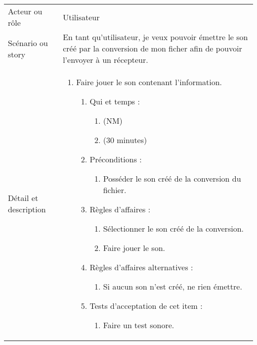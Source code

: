 \begin{longtable}{|l|p{}|}
\hline
    \rowcolor{Gray}
    \multicolumn{2}{|l|}{5} \\
\hline
    Acteur ou rôle & Utilisateur \\
\hline
    Scénario ou story & En tant qu'utilisateur, 
      je veux pouvoir émettre le son créé par la conversion de mon ficher afin de pouvoir l'envoyer à un récepteur. \\
\hline
    Détail et description &
        \begin{enumerate}[label*=\arabic*.]
            \item Faire jouer le son contenant l'information.
            \begin{enumerate}[label*=\arabic*.]
                    \item Qui et temps :
                    \begin{enumerate}[label*=\arabic*.]
                        \item (NM)
                        \item (30 minutes)
                    \end{enumerate}
                    \item Préconditions : 
                    \begin{enumerate}[label*=\arabic*.]
                        \item Posséder le son créé de la conversion du fichier.
                    \end{enumerate}
                    \item Règles d’affaires :
                    \begin{enumerate}[label*=\arabic*.]
                        \item Sélectionner le son créé de la conversion.
                        \item Faire jouer le son.
                    \end{enumerate}
                    \item Règles d’affaires alternatives :
                    \begin{enumerate}[label*=\arabic*.]
                        \item Si aucun son n'est créé, ne rien émettre.
                    \end{enumerate}
                    \item Tests d'acceptation de cet item :
                    \begin{enumerate}[label*=\arabic*.]
                        \item Faire un test sonore.

\end{enumerate}
\end{enumerate}
\end{enumerate}
\end{longtable}
